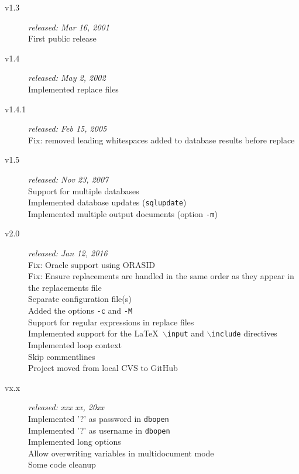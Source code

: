 \documentclass{article}
\newcommand{\bs}{\ensuremath{\backslash}}
\begin{document}
\begin{description}
\item[v1.3] \textit{released: Mar 16, 2001}\\
First public release
\item[v1.4] \textit{released: May 2, 2002}\\
Implemented replace files
\item[v1.4.1] \textit{released: Feb 15, 2005}\\
Fix: removed leading whitespaces added to database results before replace
\item[v1.5] \textit{released: Nov 23, 2007}\\
Support for multiple databases\\
Implemented database updates (\texttt{sqlupdate})\\
Implemented multiple output documents (option \texttt{-m})
\item[v2.0] \textit{released: Jan 12, 2016}\\
Fix: Oracle support using ORASID\\
Fix: Ensure replacements are handled in the same order as they appear in the replacements file\\
Separate configuration file(s)\\
Added the options \texttt{-c} and \texttt{-M}\\
Support for regular expressions in replace files\\
Implemented support for the \LaTeX\ \texttt{\bs input} and \texttt{\bs include} directives\\
Implemented loop context\\
Skip commentlines\\
Project moved from local CVS to GitHub
\item[vx.x] \textit{released: xxx xx, 20xx}\\
Implemented '?' as password in \texttt{dbopen}\\
Implemented '?' as username in \texttt{dbopen}\\
Implemented long options\\
Allow overwriting variables in multidocument mode\\
Some code cleanup
\end{description}
\end{document}
